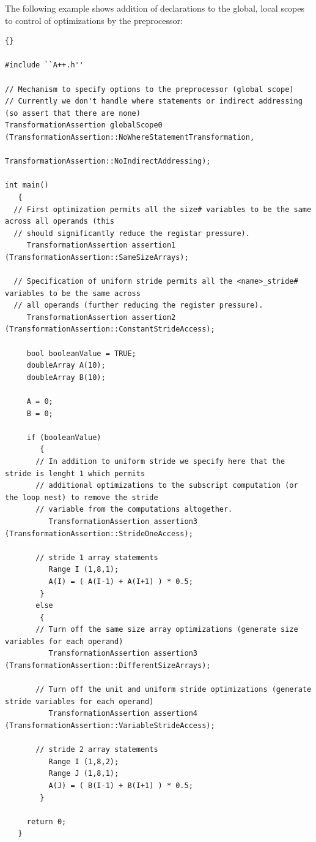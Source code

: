 \documentclass[10pt]{article}
\begin{document}
   The following example shows addition of declarations to the global, local scopes to control of
optimizations by the preprocessor:

\vspace{0.5in}

\begin{lstlisting}{}

#include ``A++.h''

// Mechanism to specify options to the preprocessor (global scope)
// Currently we don't handle where statements or indirect addressing (so assert that there are none)
TransformationAssertion globalScope0 (TransformationAssertion::NoWhereStatementTransformation,
                                      TransformationAssertion::NoIndirectAddressing);

int main()
   {
  // First optimization permits all the size# variables to be the same across all operands (this
  // should significantly reduce the registar pressure).
     TransformationAssertion assertion1 (TransformationAssertion::SameSizeArrays);

  // Specification of uniform stride permits all the <name>_stride# variables to be the same across
  // all operands (further reducing the register pressure).
     TransformationAssertion assertion2 (TransformationAssertion::ConstantStrideAccess);

     bool booleanValue = TRUE;
     doubleArray A(10);
     doubleArray B(10);

     A = 0;
     B = 0;

     if (booleanValue)
        {
       // In addition to uniform stride we specify here that the stride is lenght 1 which permits
       // additional optimizations to the subscript computation (or the loop nest) to remove the stride
       // variable from the computations altogether.
          TransformationAssertion assertion3 (TransformationAssertion::StrideOneAccess);

       // stride 1 array statements
          Range I (1,8,1);
          A(I) = ( A(I-1) + A(I+1) ) * 0.5;
        }
       else
        {
       // Turn off the same size array optimizations (generate size variables for each operand)
          TransformationAssertion assertion3 (TransformationAssertion::DifferentSizeArrays);

       // Turn off the unit and uniform stride optimizations (generate stride variables for each operand)
          TransformationAssertion assertion4 (TransformationAssertion::VariableStrideAccess);

       // stride 2 array statements
          Range I (1,8,2);
          Range J (1,8,1);
          A(J) = ( B(I-1) + B(I+1) ) * 0.5;
        }

     return 0;
   }

\end{lstlisting}
\end{document}

